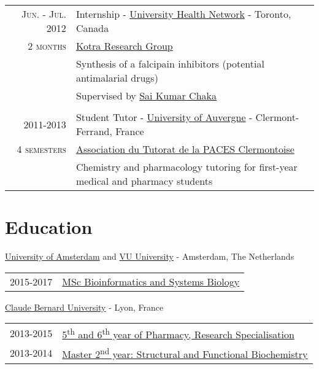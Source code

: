 \documentclass[a4paper, 10pt]{article} %
\begin{document}
\begin{tabular}{r|p{12.5cm}}

\textsc{Jun. - Jul. 2012} & Internship - \href{http://www.uhn.ca/}{University Health Network} - Toronto, Canada \\
\textsc{2 months} & \href{http://kotralab.uhnresearch.ca/}{Kotra Research Group} \\
& \footnotesize{Synthesis of a falcipain inhibitors (potential antimalarial drugs)} \\
& \footnotesize{Supervised by \href{http://www.linkedin.com/in/sai-kumar-chakka-178aa215}{Sai Kumar Chaka}} \\
\multicolumn{2}{c}{} \\


\textsc{2011-2013} & Student Tutor - \href{http://www.u-clermont1.fr/}{University of Auvergne} - Clermont-Ferrand, France \\
\textsc{4 semesters} & \href{https://www.atpclermont.fr/}{Association du Tutorat de la PACES Clermontoise}\\
& \footnotesize{Chemistry and pharmacology tutoring for first-year medical and pharmacy students} \\

\end{tabular}


\section{Education}

\href{http://www.uva.nl/en/home}{University of Amsterdam} and \href{http://www.vu.nl/en/index.aspx}{VU University} - Amsterdam, The Netherlands

\begin{tabular}{ll}
\textsc{2015-2017} & \href{http://gss.uva.nl/future-msc-students/life-and-earth-sciences/content33/systems-biology.html}{MSc Bioinformatics and Systems Biology}
\end{tabular}

\href{http://www.univ-lyon1.fr/en/home-759942.kjsp?RH=WWW-FR}{Claude Bernard University} - Lyon, France

\begin{tabular}{ll}
\textsc{2013-2015} & \href{http://ispb.univ-lyon1.fr/}{5\textsuperscript{th} and 6\textsuperscript{th} year of Pharmacy, Research Specialisation} \\
\textsc{2013-2014} & \href{http://spiralconnect.univ-lyon1.fr/webapp/website/website.html?id=2218791&read=true}{Master 2\textsuperscript{nd} year: Structural and Functional Biochemistry}
\end{tabular}
\end{document}
